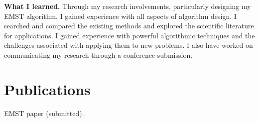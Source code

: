 \documentclass[twoside,leqno, 12pt]{article}
\begin{document}
\textbf{What I learned.}  Through my research involvements, particularly designing my EMST algorithm, I 
gained experience with all aspects of algorithm design.  I searched and compared the existing methods and explored the scientific literature for applications.  I gained experience with powerful algorithmic techniques and the challenges associated with applying them to new problems.  I also have worked on communicating my research through a conference submission.


\section{Publications}

EMST paper (submitted).




\end{document}
